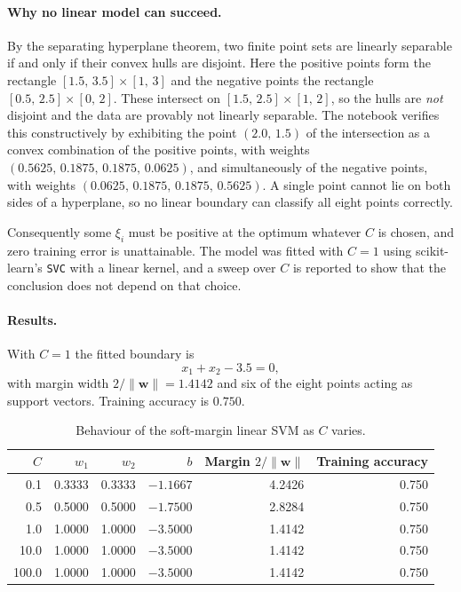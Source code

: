 \documentclass[11pt,a4paper]{article}
\newcommand{\code}[1]{\texttt{#1}}
\begin{document}
\paragraph{Why no linear model can succeed.} By the separating hyperplane theorem, two
finite point sets are linearly separable if and only if their convex hulls are disjoint.
Here the positive points form the rectangle $[1.5,\,3.5] \times [1,\,3]$ and the negative
points the rectangle $[0.5,\,2.5] \times [0,\,2]$. These intersect on
$[1.5,\,2.5] \times [1,\,2]$, so the hulls are \emph{not} disjoint and the data are
provably not linearly separable. The notebook verifies this constructively by exhibiting
the point $(2.0,\,1.5)$ of the intersection as a convex combination of the positive points,
with weights $(0.5625,\, 0.1875,\, 0.1875,\, 0.0625)$, and simultaneously of the negative
points, with weights $(0.0625,\, 0.1875,\, 0.1875,\, 0.5625)$. A single point cannot lie on
both sides of a hyperplane, so no linear boundary can classify all eight points correctly.

Consequently some $\xi_i$ must be positive at the optimum whatever $C$ is chosen, and zero
training error is unattainable. The model was fitted with $C = 1$ using scikit-learn's
\code{SVC} with a linear kernel, and a sweep over $C$ is reported to show that the
conclusion does not depend on that choice.

\paragraph{Results.} With $C = 1$ the fitted boundary is
\[
x_1 + x_2 - 3.5 = 0,
\]
with margin width $2/\|\mathbf{w}\| = 1.4142$ and six of the eight points acting as support
vectors. Training accuracy is $0.750$.

\begin{table}[H]
\centering
\caption{Behaviour of the soft-margin linear SVM as $C$ varies.}
\label{tab:csweep}
\begin{tabular}{rrrrrr}
\toprule
$C$ & $w_1$ & $w_2$ & $b$ & Margin $2/\|\mathbf{w}\|$ & Training accuracy \\
\midrule
0.1   & 0.3333 & 0.3333 & $-1.1667$ & 4.2426 & 0.750 \\
0.5   & 0.5000 & 0.5000 & $-1.7500$ & 2.8284 & 0.750 \\
1.0   & 1.0000 & 1.0000 & $-3.5000$ & 1.4142 & 0.750 \\
10.0  & 1.0000 & 1.0000 & $-3.5000$ & 1.4142 & 0.750 \\
100.0 & 1.0000 & 1.0000 & $-3.5000$ & 1.4142 & 0.750 \\
\bottomrule
\end{tabular}
\end{table}
\end{document}
